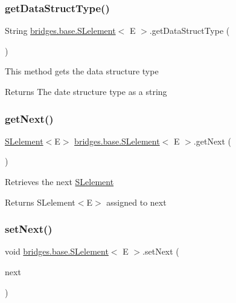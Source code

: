 \subsubsection{\texorpdfstring{get\+Data\+Struct\+Type()}{getDataStructType()}}
{\footnotesize\ttfamily String \hyperlink{classbridges_1_1base_1_1_s_lelement}{bridges.\+base.\+S\+Lelement}$<$ E $>$.get\+Data\+Struct\+Type (\begin{DoxyParamCaption}{ }\end{DoxyParamCaption})}

This method gets the data structure type

\begin{DoxyReturn}{Returns}
The date structure type as a string 
\end{DoxyReturn}
\hypertarget{classbridges_1_1base_1_1_s_lelement_a060c4671e05e3f20b16630343393b80d}{}\label{classbridges_1_1base_1_1_s_lelement_a060c4671e05e3f20b16630343393b80d} 
\subsubsection{\texorpdfstring{get\+Next()}{getNext()}}
{\footnotesize\ttfamily \hyperlink{classbridges_1_1base_1_1_s_lelement}{S\+Lelement}$<$E$>$ \hyperlink{classbridges_1_1base_1_1_s_lelement}{bridges.\+base.\+S\+Lelement}$<$ E $>$.get\+Next (\begin{DoxyParamCaption}{ }\end{DoxyParamCaption})}

Retrieves the next \hyperlink{classbridges_1_1base_1_1_s_lelement}{S\+Lelement} \begin{DoxyReturn}{Returns}
S\+Lelement$<$\+E$>$ assigned to next 
\end{DoxyReturn}
\hypertarget{classbridges_1_1base_1_1_s_lelement_afdd42f03071b2614822b73729e1a5a1a}{}\label{classbridges_1_1base_1_1_s_lelement_afdd42f03071b2614822b73729e1a5a1a} 
\subsubsection{\texorpdfstring{set\+Next()}{setNext()}}
{\footnotesize\ttfamily void \hyperlink{classbridges_1_1base_1_1_s_lelement}{bridges.\+base.\+S\+Lelement}$<$ E $>$.set\+Next (\begin{DoxyParamCaption}\item[{\hyperlink{classbridges_1_1base_1_1_s_lelement}{S\+Lelement}$<$ E $>$}]{next }\end{DoxyParamCaption})}

